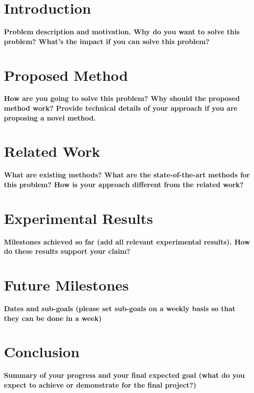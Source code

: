 \documentclass[11pt]{article}
\title{\xxx{Paper Title Here}}
\author{Rob Goeddel \and Lauren Hinkle \and James Kirk \and Aaron Mininger}
\date{}
\newcommand{\xxx}[1]{{\bf \color{red} #1}}
\begin{document}
\maketitle

\begin{abstract}
\xxx{Abstract goes here, 1 par. max}
Dijkstra was a cool guy and it's fun to cite his papers~\cite{dijkstra1959}.
\end{abstract}

\section{Introduction}
\xxx{Problem description and motivation. Why do you want to solve this
    problem? What's the impact if you can solve this problem?}

\section{Proposed Method}
\xxx{How are you going to solve this problem? Why should the proposed method
    work? Provide technical details of your approach if you are proposing a
    novel method.}

\section{Related Work}
\xxx{What are existing methods? What are the state-of-the-art methods for this
    problem? How is your approach different from the related work?}

\section{Experimental Results}
\xxx{Milestones achieved so far (add all relevant experimental results). How
    do these results support your claim?}

\section{Future Milestones}
\xxx{Dates and sub-goals (please set sub-goals on a weekly basis so that they
    can be done in a week)}

\section{Conclusion}
\xxx{Summary of your progress and your final expected goal (what do you expect
    to achieve or demonstrate for the final project?)}



\end{document}
